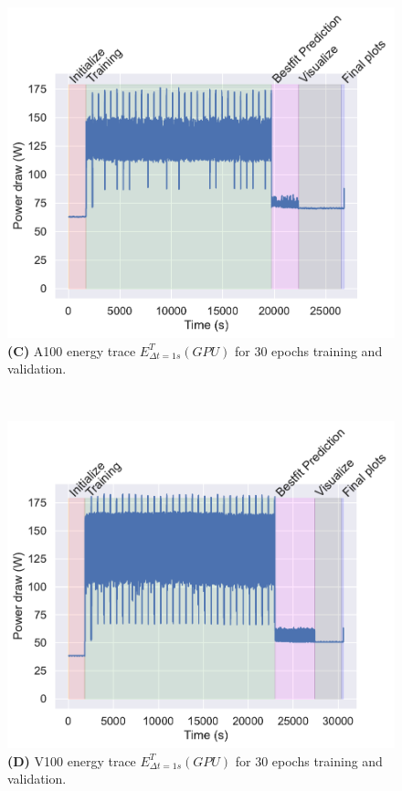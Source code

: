 \documentclass[utf8]{FrontiersinVancouver} %
\begin{document}
\begin{figure}[htb]
{\begin{center}
     \begin{minipage}[b]{0.43\textwidth}
        \includegraphics[width=1.0\linewidth]{images/a100-shaded-energy-30-epochs}
        {\bf (C)} A100 energy trace $E^T_{\Delta t=1s}(GPU)$ for 30 epochs training and validation.
     \end{minipage}
     \ \
     \begin{minipage}[b]{0.43\textwidth}
        \includegraphics[width=1.0\linewidth]{images/v100-shaded-energy-30-epochs}
        {\bf (D)} V100 energy trace $E^T_{\Delta t=1s}(GPU)$ for 30 epochs training and validation.
     \end{minipage}


\end{center}}
\end{figure}
\end{document}
